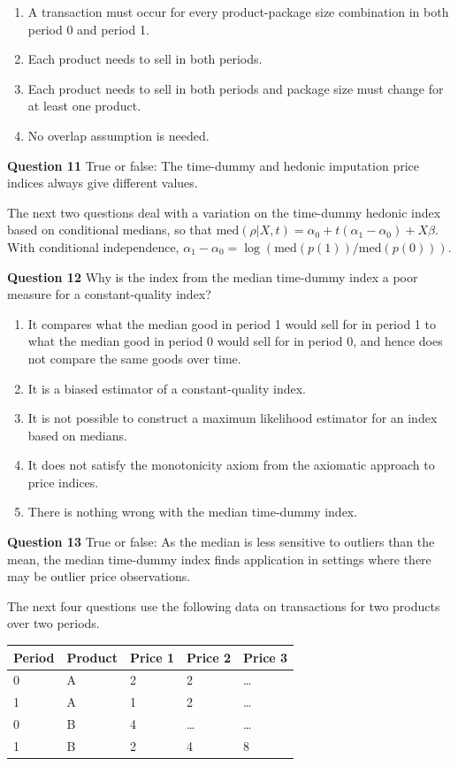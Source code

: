 \documentclass[]{article}
\begin{document}
\begin{enumerate}
\def\labelenumi{\alph{enumi})}
\item
  A transaction must occur for every product-package size combination in both period 0 and period 1.
\item
  Each product needs to sell in both periods.
\item
  Each product needs to sell in both periods and package size must change for at least one product.
\item
  No overlap assumption is needed.
\end{enumerate}

\textbf{Question 11} True or false: The time-dummy and hedonic imputation price indices always give different values.

The next two questions deal with a variation on the time-dummy hedonic index based on conditional medians, so that \(\text{med}(\rho | X, t) = \alpha_{0} + t (\alpha_{1} - \alpha_{0}) + X \beta\). With conditional independence, \(\alpha_{1} - \alpha_{0} = \log(\text{med}(p(1)) / \text{med}(p(0)))\).

\textbf{Question 12} Why is the index from the median time-dummy index a poor measure for a constant-quality index?

\begin{enumerate}
\def\labelenumi{\alph{enumi})}
\item
  It compares what the median good in period 1 would sell for in period 1 to what the median good in period 0 would sell for in period 0, and hence does not compare the same goods over time.
\item
  It is a biased estimator of a constant-quality index.
\item
  It is not possible to construct a maximum likelihood estimator for an index based on medians.
\item
  It does not satisfy the monotonicity axiom from the axiomatic approach to price indices.
\item
  There is nothing wrong with the median time-dummy index.
\end{enumerate}

\textbf{Question 13} True or false: As the median is less sensitive to outliers than the mean, the median time-dummy index finds application in settings where there may be outlier price observations.

The next four questions use the following data on transactions for two products over two periods.

\begin{longtable}[]{@{}lllll@{}}
\toprule
Period & Product & Price 1 & Price 2 & Price 3\tabularnewline
\midrule
\endhead
0 & A & 2 & 2 & \ldots{}\tabularnewline
1 & A & 1 & 2 & \ldots{}\tabularnewline
0 & B & 4 & \ldots{} & \ldots{}\tabularnewline
1 & B & 2 & 4 & 8\tabularnewline
\bottomrule
\end{longtable}
\end{document}

